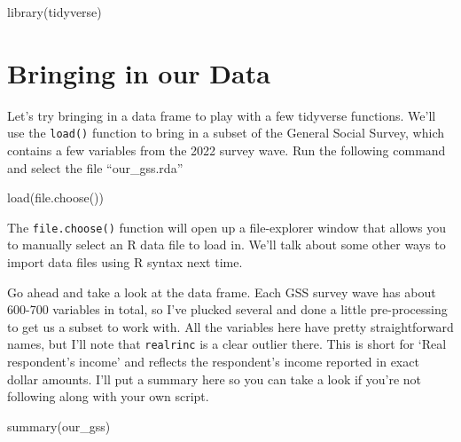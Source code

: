 \documentclass[
  letterpaper,
  DIV=11,
  numbers=noendperiod]{scrreprt}
\newenvironment{Shaded}{\begin{snugshade}}{\end{snugshade}}
\newcommand{\FunctionTok}[1]{\textcolor[rgb]{0.28,0.35,0.67}{#1}}
\newcommand{\NormalTok}[1]{\textcolor[rgb]{0.00,0.23,0.31}{#1}}
\begin{document}
\begin{Shaded}
\begin{Highlighting}[]
\FunctionTok{library}\NormalTok{(tidyverse)}
\end{Highlighting}
\end{Shaded}

\section{Bringing in our Data}\label{bringing-in-our-data}

Let's try bringing in a data frame to play with a few tidyverse
functions. We'll use the \texttt{load()} function to bring in a subset
of the General Social Survey, which contains a few variables from the
2022 survey wave. Run the following command and select the file
``our\_gss.rda''

\begin{Shaded}
\begin{Highlighting}[]
\FunctionTok{load}\NormalTok{(}\FunctionTok{file.choose}\NormalTok{())}
\end{Highlighting}
\end{Shaded}

The \texttt{file.choose()} function will open up a file-explorer window
that allows you to manually select an R data file to load in. We'll talk
about some other ways to import data files using R syntax next time.

Go ahead and take a look at the data frame. Each GSS survey wave has
about 600-700 variables in total, so I've plucked several and done a
little pre-processing to get us a subset to work with. All the variables
here have pretty straightforward names, but I'll note that
\texttt{realrinc} is a clear outlier there. This is short for `Real
respondent's income' and reflects the respondent's income reported in
exact dollar amounts. I'll put a summary here so you can take a look if
you're not following along with your own script.

\begin{Shaded}
\begin{Highlighting}[]
\FunctionTok{summary}\NormalTok{(our\_gss)}
\end{Highlighting}
\end{Shaded}
\end{document}
